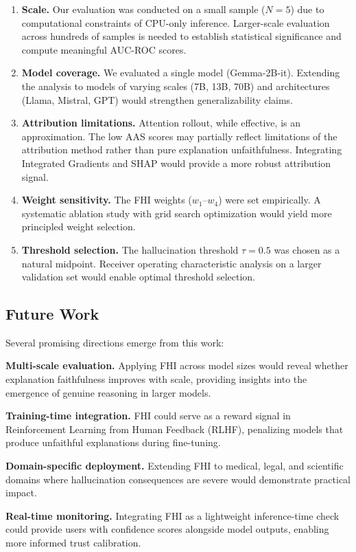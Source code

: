 \begin{enumerate}
    \item \textbf{Scale.} Our evaluation was conducted on a small sample ($N=5$) due to computational constraints of CPU-only inference. Larger-scale evaluation across hundreds of samples is needed to establish statistical significance and compute meaningful AUC-ROC scores.
    
    \item \textbf{Model coverage.} We evaluated a single model (Gemma-2B-it). Extending the analysis to models of varying scales (7B, 13B, 70B) and architectures (Llama, Mistral, GPT) would strengthen generalizability claims.
    
    \item \textbf{Attribution limitations.} Attention rollout, while effective, is an approximation. The low AAS scores may partially reflect limitations of the attribution method rather than pure explanation unfaithfulness. Integrating Integrated Gradients and SHAP would provide a more robust attribution signal.
    
    \item \textbf{Weight sensitivity.} The FHI weights ($w_1$--$w_4$) were set empirically. A systematic ablation study with grid search optimization would yield more principled weight selection.
    
    \item \textbf{Threshold selection.} The hallucination threshold $\tau = 0.5$ was chosen as a natural midpoint. Receiver operating characteristic analysis on a larger validation set would enable optimal threshold selection.
\end{enumerate}

\subsection{Future Work}

Several promising directions emerge from this work:

\textbf{Multi-scale evaluation.} Applying FHI across model sizes would reveal whether explanation faithfulness improves with scale, providing insights into the emergence of genuine reasoning in larger models.

\textbf{Training-time integration.} FHI could serve as a reward signal in Reinforcement Learning from Human Feedback (RLHF), penalizing models that produce unfaithful explanations during fine-tuning.

\textbf{Domain-specific deployment.} Extending FHI to medical, legal, and scientific domains where hallucination consequences are severe would demonstrate practical impact.

\textbf{Real-time monitoring.} Integrating FHI as a lightweight inference-time check could provide users with confidence scores alongside model outputs, enabling more informed trust calibration.
